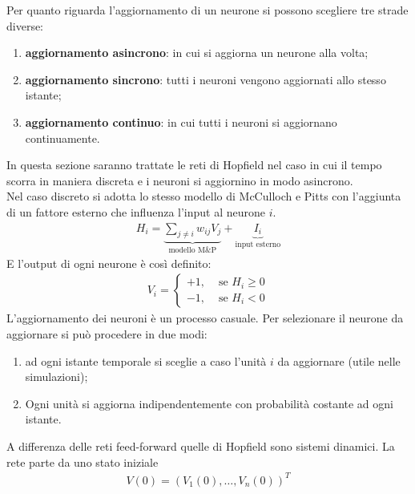 \newpage

Per quanto riguarda l'aggiornamento di un neurone si possono scegliere tre strade diverse:
\begin{enumerate}
	\item \textbf{aggiornamento asincrono}: in cui si aggiorna un neurone alla volta;
	\item \textbf{aggiornamento sincrono}: tutti i neuroni vengono aggiornati allo stesso istante;
	\item \textbf{aggiornamento continuo}: in cui tutti i neuroni si aggiornano continuamente.
\end{enumerate}

In questa sezione saranno trattate le reti di Hopfield nel caso in cui il tempo scorra in maniera discreta e i neuroni si aggiornino in modo asincrono.\\

Nel caso discreto si adotta lo stesso modello di McCulloch e Pitts con l'aggiunta di un fattore esterno che influenza l'input al neurone $i$.
\begin{align}
	H_i = \underbrace{\sum_{j \neq i} w_{ij} V_j}_\textrm{modello M\&P} + \underbrace{I_i}_\textrm{input esterno}
\end{align}
E l'output di ogni neurone è così definito:
\begin{align}
	V_i =
	\begin{cases}
		+1, &\text{ se } H_i \geq 0\\
		-1, &\text{ se } H_i < 0
	\end{cases}\label{eq:learningrule}
\end{align}
L'aggiornamento dei neuroni è un processo casuale. Per selezionare il neurone da aggiornare si può procedere in due modi:
\begin{enumerate}
	\item ad ogni istante temporale si sceglie a caso l'unità $i$ da aggiornare (utile nelle simulazioni);
	\item Ogni unità si aggiorna indipendentemente con probabilità costante ad ogni istante.
\end{enumerate}

\newpage

A differenza delle reti feed-forward quelle di Hopfield sono sistemi dinamici. La rete parte da uno stato iniziale
\begin{align*}
	V(0) = (V_1(0), \dots, V_n(0))^T
\end{align*}

